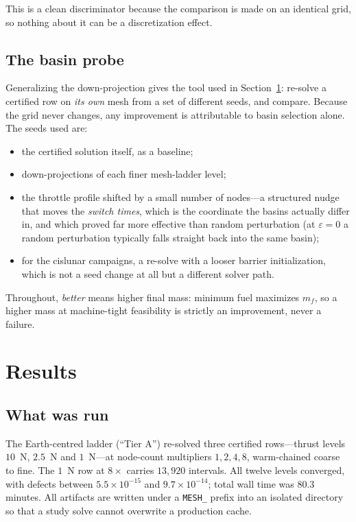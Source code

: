 \documentclass[11pt]{article}
\newcommand{\mf}{m_f}
\begin{document}
This is a clean discriminator because the comparison is made on an identical
grid, so nothing about it can be a discretization effect.

\subsection{The basin probe}

Generalizing the down-projection gives the tool used in
Section~\ref{sec:results}: re-solve a certified row on \emph{its own} mesh from
a set of different seeds, and compare. Because the grid never changes, any
improvement is attributable to basin selection alone. The seeds used are:

\begin{itemize}
  \item the certified solution itself, as a baseline;
  \item down-projections of each finer mesh-ladder level;
  \item the throttle profile shifted by a small number of nodes---a structured
  nudge that moves the \emph{switch times}, which is the coordinate the basins
  actually differ in, and which proved far more effective than random
  perturbation (at $\varepsilon = 0$ a random perturbation typically falls
  straight back into the same basin);
  \item for the cislunar campaigns, a re-solve with a looser barrier
  initialization, which is not a seed change at all but a different solver
  path.
\end{itemize}

Throughout, \emph{better} means higher final mass: minimum fuel maximizes
$\mf$, so a higher mass at machine-tight feasibility is strictly an
improvement, never a failure.

\section{Results}
\label{sec:results}

\subsection{What was run}

The Earth-centred ladder (``Tier A'') re-solved three certified rows---thrust
levels $10$~N, $2.5$~N and $1$~N---at node-count multipliers
$1, 2, 4, 8$, warm-chained coarse to fine. The $1$~N row at $8\times$ carries
$13{,}920$ intervals. All twelve levels converged, with defects between
$5.5\times10^{-15}$ and $9.7\times10^{-14}$; total wall time was $80.3$
minutes. All artifacts are written under a \texttt{MESH\_} prefix into an
isolated directory so that a study solve cannot overwrite a production cache.
\end{document}
